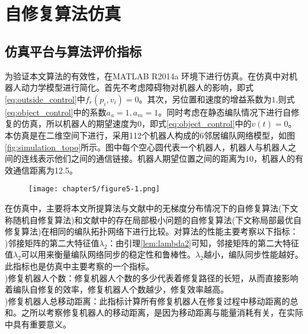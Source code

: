 \chapter{自修复算法仿真}

\section{仿真平台与算法评价指标}
为验证本文算法的有效性，在MATLAB R2014a 环境下进行仿真。在仿真中对机器人动力学模型进行简化。首先不考虑障碍物对机器人的影响，即式\ref{eq:outside_control}中$f_r(p_i,v_i) = 0$。其次，另位置和速度的增益系数为$1$,则式\ref{eq:object_control}中的系数$a_a=1, a_m=1$。同时考虑在静态编队情况下进行自修复的仿真，所以机器人的期望速度为0，即式\ref{eq:object_control}中的$v(t) = 0$。本仿真是在二维空间下进行，采用112个机器人构成的6邻居编队网络模型，如图\ref{fig:simulation_topo}所示。图中每个空心圆代表一个机器人，机器人与机器人之间的连线表示他们之间的通信链接。机器人期望位置之间的距离为10，机器人的有效通信距离为12.5。
\begin{figure}[!htbp]
	\centering
	\texttt{[image: chapter5/figure5-1.png]}
\end{figure}

在仿真中，主要将本文所提算法与文献\parencite{张飞2008移动机器人覆盖问题的研究}中的无梯度分布情况下的自修复算法(下文称随机自修复算法)和文献\parencite{liu2015gradient}中的存在局部极小问题的自修复算法(下文称局部最优自修复算法)在相同的编队拓扑网络下进行比较。对算法的性能主要考察以下指标：\\
)邻接矩阵的第二大特征值$\lambda_2$：由引理\ref{lem:lambda2}可知，邻接矩阵的第二大特征值$\lambda_2$可以用来衡量编队网络同步的稳定性和鲁棒性。$\lambda_2$越小，编队同步性能越好。此指标也是仿真中主要考察的一个指标。\\
)修复机器人个数：修复机器人个数的多少代表着修复路径的长短，从而直接影响着编队自修复的效率，修复机器人个数越少，修复效率越高。\\
)修复机器人总移动距离：此指标计算所有修复机器人在修复过程中移动距离的总和。之所以考察修复机器人的移动距离，是因为移动距离与能量消耗有关，在实际中具有重要意义。

